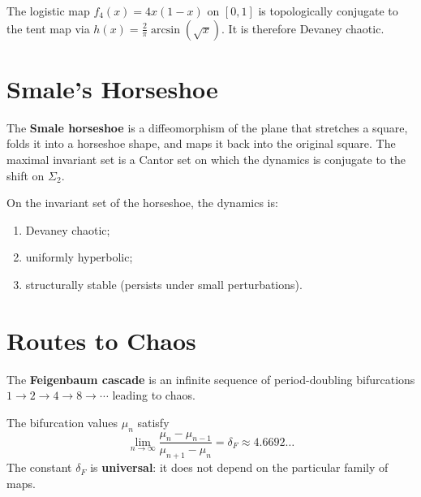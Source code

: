 \begin{theorem}
The logistic map $f_4(x) = 4x(1-x)$ on $[0,1]$ is topologically conjugate
to the tent map via $h(x) = \frac{2}{\pi}\arcsin(\sqrt{x})$. It is therefore
Devaney chaotic.
\end{theorem}

\section{Smale's Horseshoe}

\begin{definition}
The \textbf{Smale horseshoe} is a diffeomorphism of the plane that stretches
a square, folds it into a horseshoe shape, and maps it back into the original
square. The maximal invariant set is a Cantor set on which the dynamics is
conjugate to the shift on $\Sigma_2$.
\end{definition}

\begin{theorem}[Smale, 1967]
On the invariant set of the horseshoe, the dynamics is:
\begin{enumerate}
    \item Devaney chaotic;
    \item uniformly hyperbolic;
    \item structurally stable (persists under small perturbations).
\end{enumerate}
\end{theorem}

\section{Routes to Chaos}

\begin{definition}
The \textbf{Feigenbaum cascade} is an infinite sequence of period-doubling
bifurcations $1 \to 2 \to 4 \to 8 \to \cdots$ leading to chaos.
\end{definition}

\begin{theorem}
The bifurcation values $\mu_n$ satisfy
\[
    \lim_{n \to \infty} \frac{\mu_n - \mu_{n-1}}{\mu_{n+1} - \mu_n}
    = \delta_F \approx 4.6692\ldots
\]
The constant $\delta_F$ is \textbf{universal}: it does not depend on the
particular family of maps.
\end{theorem}

